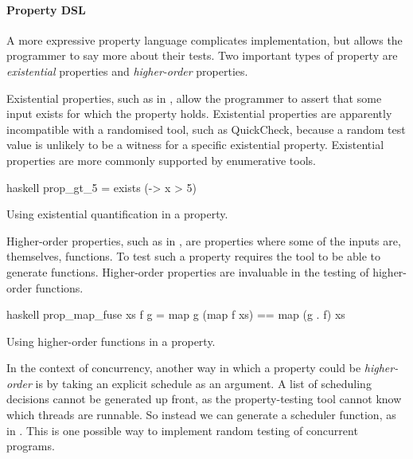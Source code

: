 \paragraph{Property DSL}
A more expressive property language complicates implementation, but
allows the programmer to say more about their tests.  Two important
types of property are \emph{existential} properties and
\emph{higher-order} properties.

Existential properties, such as in , allow the
programmer to assert that some input exists for which the property
holds.  Existential properties are apparently incompatible with a
randomised tool, such as QuickCheck, because a random test value is
unlikely to be a witness for a specific existential property.
Existential properties are more commonly supported by enumerative
tools.

\begin{listing}
\centering
\begin{cminted}{haskell}
prop_gt_5 = exists (\x -> x > 5)
\end{cminted}
\caption{Using existential quantification in a property.}\label{lst:prop_gt_5}
\end{listing}

Higher-order properties, such as in , are
properties where some of the inputs are, themselves, functions.  To
test such a property requires the tool to be able to generate
functions.  Higher-order properties are invaluable in the testing of
higher-order functions.

\begin{listing}
\centering
\begin{cminted}{haskell}
prop_map_fuse xs f g = map g (map f xs) == map (g . f) xs
\end{cminted}
\caption{Using higher-order functions in a property.}\label{lst:prop_map_fuse}
\end{listing}

In the context of concurrency, another way in which a property could
be \emph{higher-order} is by taking an explicit schedule as an
argument.  A list of scheduling decisions cannot be generated up
front, as the property-testing tool cannot know which threads are
runnable.  So instead we can generate a scheduler function, as in
\cite{ankuzik2014}.  This is one possible way to implement random
testing of concurrent programs.

